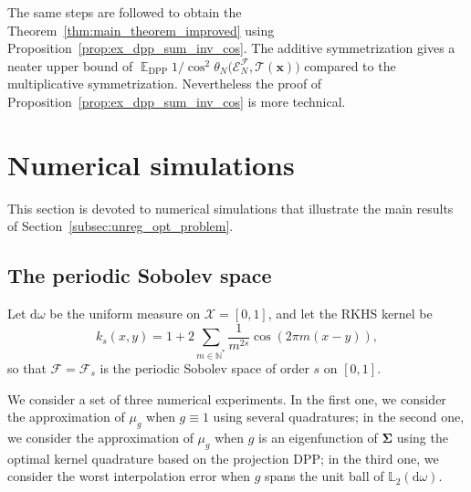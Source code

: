 \documentclass[twoside,11pt]{book}
\numberwithin{theorem}{chapter}
\numberwithin{definition}{chapter}
\numberwithin{proposition}{chapter}
\numberwithin{corollary}{chapter}
\numberwithin{example}{chapter}
\numberwithin{lemma}{chapter}
\DeclareMathOperator{\DPP}{\mathrm{DPP}}
\DeclareMathOperator{\EX}{\mathbb{E}}
\newcommand{\rb}[1]{\textcolor{magenta}{#1}}
\begin{document}
The same steps are followed to obtain the Theorem~\ref{thm:main_theorem_improved} using Proposition~\ref{prop:ex_dpp_sum_inv_cos}.
The additive symmetrization gives a neater upper bound of $\displaystyle \EX_{\DPP}  1/\cos^{2} \theta_{N} \bigg(\mathcal{E}^{\mathcal{F}}_{N}, \mathcal{T}(\bm{x}) \bigg)$ compared to the multiplicative symmetrization. Nevertheless the proof of Proposition~\ref{prop:ex_dpp_sum_inv_cos} is more technical.



\section{Numerical simulations}
This section is devoted to numerical simulations that illustrate the main results of Section~\ref{subsec:unreg_opt_problem}.

\subsection{The periodic Sobolev space}\label{s:sobolev_numsim}
Let $\mathrm{d}\omega$ be the uniform measure on $\mathcal{X} = [0,1]$, and let the RKHS kernel be \citep{BeTh11}
\begin{equation}
k_{s}(x,y) = 1+ 2\sum\limits_{m \in \mathbb{N}^{*}} \frac{1}{m^{2s}} \cos(2\pi m(x-y)),
\end{equation}
so that $\mathcal{F}=\mathcal{F}_{s}$ is the periodic Sobolev space of order $s$ on $[0,1]$.

We consider a set of three numerical experiments. In the first one, we consider the approximation of $\mu_{g}$ when $g \equiv 1$ using several quadratures; in the second one, we consider the approximation of $\mu_{g}$ when $g$ is an eigenfunction of $\bm{\Sigma}$ using the optimal kernel quadrature based on the projection DPP; in the third one, we consider the worst interpolation error when $g$ spans the unit ball of $\mathbb{L}_{2}(\mathrm{d}\omega)$. 
\end{document}
